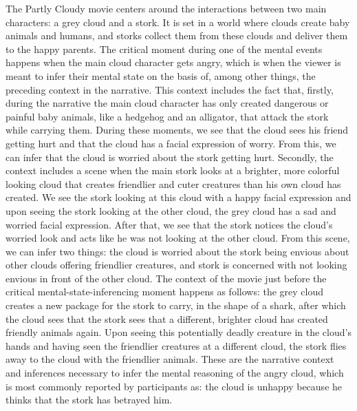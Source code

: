 The Partly Cloudy movie centers around the interactions between two main characters: a grey cloud and a stork. It is set in a world where clouds create baby animals and humans, and storks collect them from these clouds and deliver them to the happy parents. The critical moment during one of the mental events happens when the main cloud character gets angry, which is when the viewer is meant to infer their mental state on the basis of, among other things, the preceding context in the narrative. This context includes the fact that, firstly, during the narrative the main cloud character has only created dangerous or painful baby animals, like a hedgehog and an alligator, that attack the stork while carrying them. During these moments, we see that the cloud sees his friend getting hurt and that the cloud has a facial expression of worry. From this, we can infer that the cloud is worried about the stork getting hurt. Secondly, the context includes a scene when the main stork looks at a brighter, more colorful looking cloud that creates friendlier and cuter creatures than his own cloud has created. We see the stork looking at this cloud with a happy facial expression and upon seeing the stork looking at the other cloud, the grey cloud has a sad and worried facial expression. After that, we see that the stork notices the cloud's worried look and acts like he was not looking at the other cloud. From this scene, we can infer two things: the cloud is worried about the stork being envious about other clouds offering friendlier creatures, and stork is concerned with not looking envious in front of the other cloud. The context of the movie just before the critical mental-state-inferencing moment happens as follows: the grey cloud creates a new package for the stork to carry, in the shape of a shark, after which the cloud sees that the stork sees that a different, brighter cloud has created friendly animals again. Upon seeing this potentially deadly creature in the cloud's hands and having seen the friendlier creatures at a different cloud, the stork flies away to the cloud with the friendlier animals. These are the narrative context and inferences necessary to infer the mental reasoning of the angry cloud, which is most commonly reported by participants as: the cloud is unhappy because he thinks that the stork has betrayed him.  

